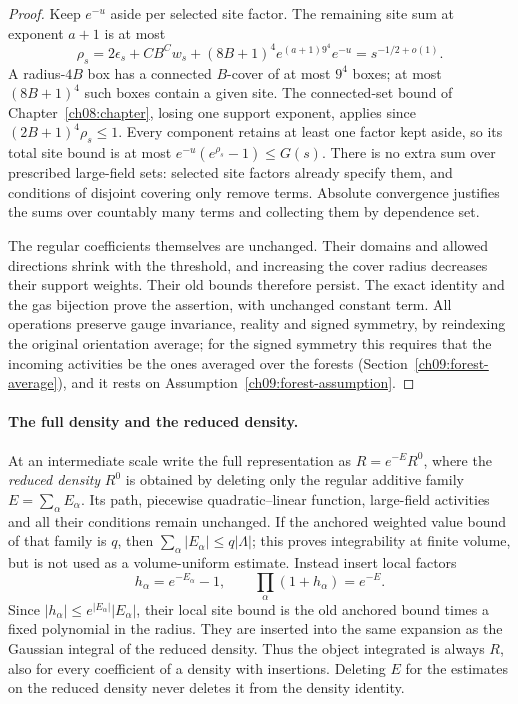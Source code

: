 \begin{proof}
Keep $e^{-u}$ aside per selected site factor. The remaining site sum
at exponent $a+1$ is at most
\[
 \rho_s=2\epsilon_s+CB^Cw_s+
       (8B+1)^4e^{(a+1)9^4}e^{-u}=s^{-1/2+o(1)}.
\]
A radius-$4B$ box has a connected $B$-cover of at most $9^4$
boxes; at most $(8B+1)^4$ such boxes contain a given site.
The connected-set bound of Chapter~\ref{ch08:chapter}, losing one
support exponent, applies since $(2B+1)^4\rho_s\le1$.
Every component retains at least one factor kept aside, so its total
site bound is at most $e^{-u}(e^{\rho_s}-1)\le G(s)$.
There is no extra sum over prescribed large-field sets: selected site factors already
specify them, and conditions of disjoint covering only remove terms.
Absolute convergence justifies the sums over countably many terms and collecting them by dependence set.

The regular coefficients themselves are unchanged. Their domains
and allowed directions shrink with the threshold, and increasing
the cover radius decreases their support weights. Their old bounds
therefore persist. The exact identity and the gas bijection prove
the assertion, with unchanged constant term. All operations preserve gauge
invariance, reality and signed symmetry, by reindexing the original
orientation average; for the signed symmetry this requires that the incoming activities be the ones averaged over the forests (Section~\ref{ch09:forest-average}), and it rests on Assumption~\ref{ch09:forest-assumption}.
\end{proof}

\paragraph{The full density and the reduced density.}
At an intermediate scale write the full representation as
$R=e^{-E}R^0$, where the \emph{reduced density} $R^0$ is obtained by deleting only the regular
additive family $E=\sum_\alpha E_\alpha$. Its path, piecewise quadratic--linear function, large-field
activities and all their conditions remain unchanged. If the anchored
weighted value bound of that family is $q$, then
$\sum_\alpha|E_\alpha|\le q|\Lambda|$; this proves integrability
at finite volume, but is not used as a volume-uniform estimate.
Instead insert local factors
\[
 h_\alpha=e^{-E_\alpha}-1,\qquad
 \prod_\alpha(1+h_\alpha)=e^{-E}.
\]
Since $|h_\alpha|\le e^{|E_\alpha|}|E_\alpha|$, their local site
bound is the old anchored bound times a fixed polynomial in the
radius. They are inserted into the same expansion as the Gaussian
integral of the reduced density. Thus the object integrated is always $R$, also
for every coefficient of a density with insertions. Deleting $E$ for the
estimates on the reduced density never deletes it from the density identity.

